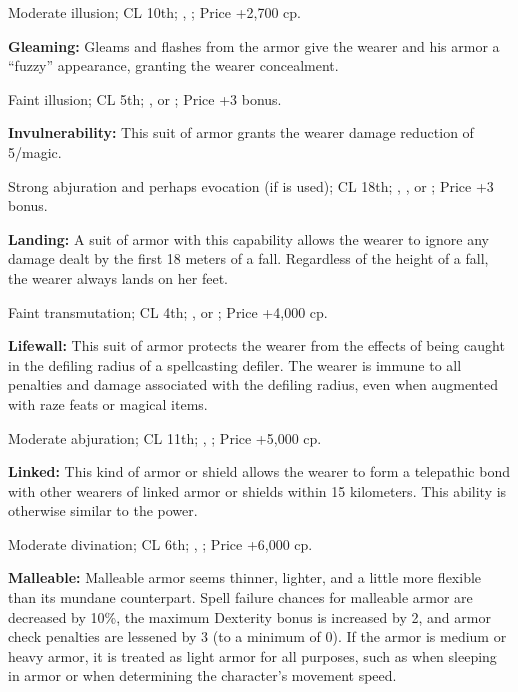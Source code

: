 Moderate illusion; CL 10th; , ; Price +2,700 cp.

\textbf{Gleaming:} Gleams and flashes from the armor give the wearer and his armor a ``fuzzy'' appearance, granting the wearer concealment.

Faint illusion; CL 5th; ,  or ; Price +3 bonus.

\textbf{Invulnerability:} This suit of armor grants the wearer damage reduction of 5/magic.

Strong abjuration and perhaps evocation (if  is used); CL 18th; , ,  or ; Price +3 bonus.

\textbf{Landing:} A suit of armor with this capability allows the wearer to ignore any damage dealt by the first 18 meters of a fall. Regardless of the height of a fall, the wearer always lands on her feet.

Faint transmutation; CL 4th; ,  or ; Price +4,000 cp.

\textbf{Lifewall:} This suit of armor protects the wearer from the effects of being caught in the defiling radius of a spellcasting defiler. The wearer is immune to all penalties and damage associated with the defiling radius, even when augmented with raze feats or magical items.

Moderate abjuration; CL 11th; , ; Price +5,000 cp.

\textbf{Linked:} This kind of armor or shield allows the wearer to form a telepathic bond with other wearers of linked armor or shields within 15 kilometers. This ability is otherwise similar to the  power.

Moderate divination; CL 6th; , ; Price +6,000 cp.

\textbf{Malleable:} Malleable armor seems thinner, lighter, and a little more flexible than its mundane counterpart. Spell failure chances for malleable armor are decreased by 10\%, the maximum Dexterity bonus is increased by 2, and armor check penalties are lessened by 3 (to a minimum of 0). If the armor is medium or heavy armor, it is treated as light armor for all purposes, such as when sleeping in armor or when determining the character's movement speed.

